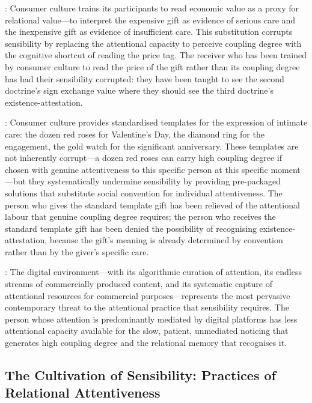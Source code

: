 : Consumer culture trains its participants to read economic value as a proxy for relational value---to interpret the expensive gift as evidence of serious care and the inexpensive gift as evidence of insufficient care. This substitution corrupts sensibility by replacing the attentional capacity to perceive coupling degree with the cognitive shortcut of reading the price tag. The receiver who has been trained by consumer culture to read the price of the gift rather than its coupling degree has had their sensibility corrupted: they have been taught to see the second doctrine's sign exchange value where they should see the third doctrine's existence-attestation.

: Consumer culture provides standardised templates for the expression of intimate care: the dozen red roses for Valentine's Day, the diamond ring for the engagement, the gold watch for the significant anniversary. These templates are not inherently corrupt---a dozen red roses can carry high coupling degree if chosen with genuine attentiveness to this specific person at this specific moment---but they systematically undermine sensibility by providing pre-packaged solutions that substitute social convention for individual attentiveness. The person who gives the standard template gift has been relieved of the attentional labour that genuine coupling degree requires; the person who receives the standard template gift has been denied the possibility of recognising existence-attestation, because the gift's meaning is already determined by convention rather than by the giver's specific care.

: The digital environment---with its algorithmic curation of attention, its endless streams of commercially produced content, and its systematic capture of attentional resources for commercial purposes---represents the most pervasive contemporary threat to the attentional practice that sensibility requires. The person whose attention is predominantly mediated by digital platforms has less attentional capacity available for the slow, patient, unmediated noticing that generates high coupling degree and the relational memory that recognises it.

\subsection{The Cultivation of Sensibility: Practices of Relational Attentiveness}
\label{p16:subsec:cultivation}

